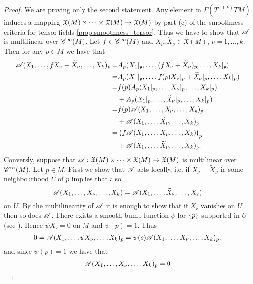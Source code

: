 \begin{appendix}
\begin{proof}
We are proving only the second statement. Any element in $\Gamma(T^{(1,k)}TM)$ induces a mapping $\mathfrak{X}(M) \times \dots \times \mathfrak{X}(M) \to \mathfrak{X}(M)$ by part (c) of the smoothness criteria for tensor fields \ref{prop:smoothness_tensor}. Thus we have to show that $\mathscr{A}$ is multilinear over $\mathscr{C}^\infty(M)$. Let $f \in \mathscr{C}^\infty(M)$ and $X_\nu,\widetilde{X}_\nu \in \mathfrak{X}(M)$, $\nu = 1,\dots,k$. Then for any $p \in M$ we have that
\begin{align*}
\Ascr(X_1,\dots,fX_\nu + \widetilde{X}_\nu,\dots,X_k)_p =& A_p(X_1\vert_p,\dots,(fX_\nu + \widetilde{X}_\nu)_p,\dots,X_k\vert_p)\\
=& A_p(X_1\vert_p,\dots,f(p)X_\nu\vert_p + \widetilde{X}_\nu\vert_p,\dots,X_k\vert_p)\\
=& f(p)A_p(X_1\vert_p,\dots,X_\nu\vert_p ,\dots,X_k\vert_p)\\
& + A_p(X_1\vert_p,\dots,\widetilde{X}_\nu\vert_p,\dots,X_k\vert_p)\\
=& f(p) \Ascr(X_1,\dots,X_\nu,\dots,X_k)_p\\
& + \Ascr(X_1,\dots,\widetilde{X}_\nu,\dots,X_k)_p\\
=& \del[1]{f \Ascr(X_1,\dots,X_\nu,\dots,X_k)}_p \\
& + \Ascr(X_1,\dots,\widetilde{X}_\nu,\dots,X_k)_p.
\end{align*}
Conversly, suppose that $\mathscr{A}: \mathfrak{X}(M) \times \dots \times \mathfrak{X}(M) \to \mathfrak{X}(M)$ is multilinear over $\mathscr{C}^\infty(M)$. Let $p \in M$. First we show that $\mathscr{A}$ acts locally, i.e. if $X_\nu = \widetilde{X}_\nu$ in some neighbourhood $U$ of $p$ implies that also 
\begin{equation*}
\mathscr{A}(X_1,\dots,X_\nu,\dots,X_k) = \mathscr{A}(X_1,\dots,\widetilde{X}_\nu,\dots,X_k)
\end{equation*}
\noindent on $U$. By the multilinearity of $\mathscr{A}$ it is enough to show that if $X_\nu$ vanishes on $U$ then so does $\mathscr{A}$. There exists a smooth bump function $\psi$ for $\cbr[0]{p}$ supported in $U$ (see \cite[44]{lee:smooth_manifolds:2013}). Hence $\psi X_\nu = 0$ on $M$ and $\psi(p) = 1$. Thus
\begin{align*}
0 = \mathscr{A}(X_1,\dots,\psi X_\nu,\dots,X_k)_p = \psi(p)\mathscr{A}(X_1,\dots,X_\nu,\dots,X_k)_p.
\end{align*}
\noindent and since $\psi(p) = 1$ we have that
\begin{equation*}
\mathscr{A}(X_1,\dots,X_\nu,\dots,X_k)_p = 0
\end{equation*}

\end{proof}
\end{appendix}
